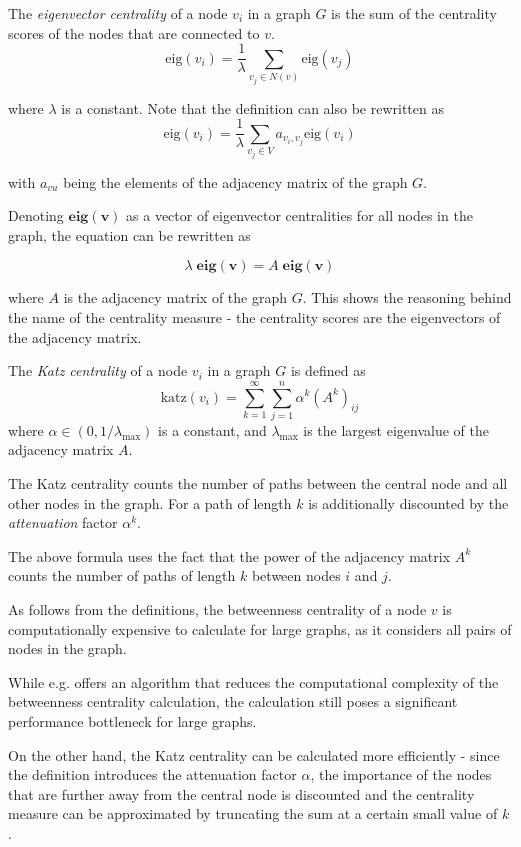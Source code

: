\begin{definition}
    The \textit{eigenvector centrality} of a node $v_i$ in a graph $G$ is the sum of the centrality scores of the nodes that are connected to $v$.
    $$
    \text{eig}(v_i) = \frac{1}{\lambda} \sum_{v_j \in N(v)} \text{eig}(v_j)
    $$

    where $\lambda$ is a constant. Note that the definition can also be rewritten as 
    $$
    \text{eig}(v_i) = \frac{1}{\lambda} \sum_{v_j \in V} a_{v_i, v_j} \text{eig}(v_i)
    $$

    with $a_{vu}$ being the elements of the adjacency matrix of the graph $G$.
    
    Denoting $\mathbf{eig(v)}$ as a vector of eigenvector centralities for all nodes in the graph, the equation can be rewritten as

    $$
    \lambda \; \mathbf{eig(v)} = A \; \mathbf{eig(v)}
    $$

    where $A$ is the adjacency matrix of the graph $G$. 
    This shows the reasoning behind the name of the centrality measure - the centrality scores are the eigenvectors of the adjacency matrix.
\end{definition}

\begin{definition}
    The \textit{Katz centrality} of a node $v_i$ in a graph $G$ is defined as
    $$
    \text{katz}(v_i) = \sum_{k=1}^{\infty} \sum_{j=1}^n \alpha^k (A^k)_{ij}
    $$
    where $\alpha \in (0, 1/\lambda_{\text{max}})$ is a constant, and $\lambda_{\text{max}}$ is the largest eigenvalue of the adjacency matrix $A$.

    The Katz centrality counts the number of paths between the central node and all other nodes in the graph.
    For a path of length $k$ is additionally discounted by the \textit{attenuation} factor $\alpha^k$.

    The above formula uses the fact that the power of the adjacency matrix $A^k$ counts the number of paths of length $k$ between nodes $i$ and $j$.
\end{definition}

\begin{mybox}{}
As follows from the definitions, the betweenness centrality of a node $v$ is computationally expensive 
to calculate for large graphs, as it considers all pairs of nodes in the graph.

While e.g. \cite{brandes-faster-centrality} offers an algorithm that reduces the computational complexity of the betweenness centrality calculation,
the calculation still poses a significant performance bottleneck for large graphs.

On the other hand, the Katz centrality can be calculated more efficiently - since the definition introduces 
the attenuation factor $\alpha$, the importance of the nodes that are further away from the central node is discounted
and the centrality measure can be approximated by truncating the sum at a certain small value of $k$.
\end{mybox}


